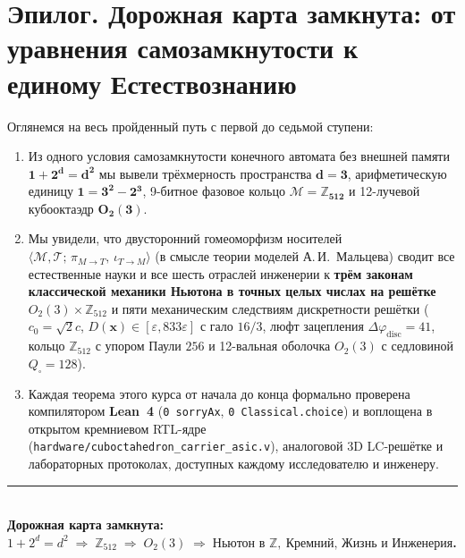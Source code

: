 \chapter*{Эпилог. Дорожная карта замкнута: от уравнения самозамкнутости к единому Естествознанию}

Оглянемся на весь пройденный путь с первой до седьмой ступени:
\begin{enumerate}[label=\textbf{\arabic*.},leftmargin=*,noitemsep]
\item Из одного условия самозамкнутости конечного автомата без внешней памяти $\mathbf{1 + 2^d = d^2}$ мы вывели трёхмерность пространства $\mathbf{d = 3}$, арифметическую единицу $\mathbf{1 = 3^2 - 2^3}$, 9-битное фазовое кольцо $\mathcal{M} = \mathbf{\mathbb{Z}_{512}}$ и 12-лучевой кубооктаэдр $\mathbf{O_2(3)}$.
\item Мы увидели, что двусторонний гомеоморфизм носителей $\langle\mathcal{M},\mathcal{T};\,\pi_{M\to T},\,\iota_{T\to M}\rangle$ (в смысле теории моделей А.\,И.~Мальцева) сводит все естественные науки и все шесть отраслей инженерии к \textbf{трём законам классической механики Ньютона в точных целых числах на решётке $O_2(3)\times\mathbb{Z}_{512}$} и пяти механическим следствиям дискретности решётки ($c_0=\sqrt{2}c$, $D(\mathbf{x})\in[\varepsilon,833\varepsilon]$ с гало $16/3$, люфт зацепления $\Delta\varphi_{\mathrm{disc}}=41$, кольцо $\mathbb{Z}_{512}$ с упором Паули $256$ и 12-вальная оболочка $O_2(3)$ с седловиной $Q_\square=128$).
\item Каждая теорема этого курса от начала до конца формально проверена компилятором \textbf{Lean~4} (\texttt{0 sorryAx}, \texttt{0 Classical.choice}) и воплощена в открытом кремниевом RTL-ядре (\texttt{hardware/cuboctahedron\_carrier\_asic.v}), аналоговой 3D LC-решётке и лабораторных протоколах, доступных каждому исследователю и инженеру.
\end{enumerate}

\bigskip
\begin{center}
  \rule{0.65\textwidth}{0.4pt}\\[6pt]
  {\large\bfseries Дорожная карта замкнута: $1 + 2^d = d^2 \;\Longrightarrow\; \mathbb{Z}_{512} \;\Longrightarrow\; O_2(3) \;\Longrightarrow\; \text{Ньютон в }\mathbb{Z},\ \text{Кремний, Жизнь и Инженерия}$.}
\end{center}
